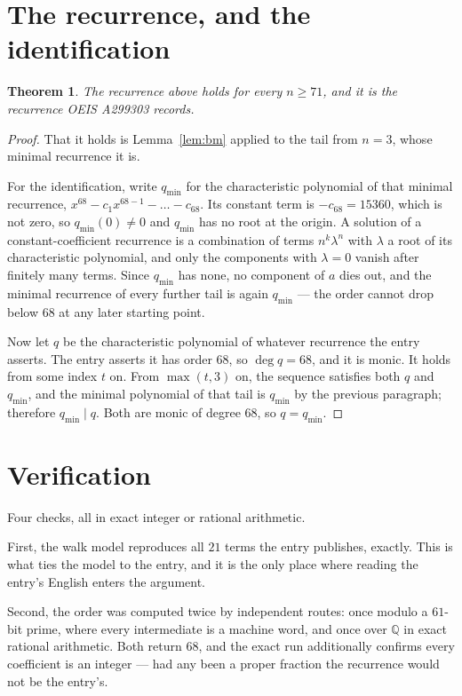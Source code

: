 \documentclass[11pt,a4paper]{article}
\theoremstyle{plain}
\newtheorem{theorem}{Theorem}
\theoremstyle{definition}
\begin{document}
\section{The recurrence, and the identification}

\begin{theorem}
The recurrence above holds for every $n\ge71$, and it is the recurrence OEIS A299303 records.
\end{theorem}

\begin{proof}
That it holds is Lemma~\ref{lem:bm} applied to the tail from $n=3$, whose minimal
recurrence it is.

For the identification, write $q_{\min}$ for the characteristic polynomial of that minimal
recurrence, $x^{68}-c_1x^{68-1}-\dots-c_{68}$. Its constant term is
$-c_{68}=15360$, which is not zero, so $q_{\min}(0)\neq0$ and $q_{\min}$ has no
root at the origin. A solution of a constant-coefficient recurrence is a combination of terms
$n^{k}\lambda^{n}$ with $\lambda$ a root of its characteristic polynomial, and only the
components with $\lambda=0$ vanish after finitely many terms. Since $q_{\min}$ has none, no
component of $a$ dies out, and the minimal recurrence of every further tail is again
$q_{\min}$ --- the order cannot drop below $68$ at any later starting point.

Now let $q$ be the characteristic polynomial of whatever recurrence the entry asserts. The
entry asserts it has order $68$, so $\deg q=68$, and it is monic. It holds from some
index $t$ on. From $\max(t,3)$ on, the sequence satisfies both $q$ and $q_{\min}$, and
the minimal polynomial of that tail is $q_{\min}$ by the previous paragraph; therefore
$q_{\min}\mid q$. Both are monic of degree $68$, so $q=q_{\min}$.
\end{proof}

\section{Verification}

Four checks, all in exact integer or rational arithmetic.

First, the walk model reproduces all $21$ terms the entry publishes, exactly. This is
what ties the model to the entry, and it is the only place where reading the entry's English
enters the argument.

Second, the order was computed twice by independent routes: once modulo a $61$-bit prime, where
every intermediate is a machine word, and once over $\mathbb{Q}$ in exact rational arithmetic.
Both return $68$, and the exact run additionally confirms every coefficient is an integer
--- had any been a proper fraction the recurrence would not be the entry's.
\end{document}
